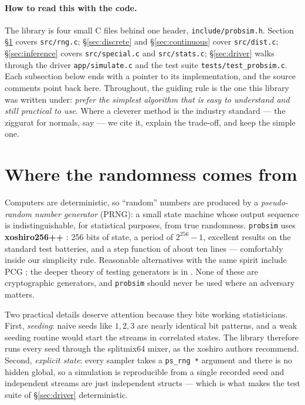 \documentclass[11pt]{article}
\numberwithin{equation}{section}
\begin{document}
\paragraph{How to read this with the code.}
The library is four small C files behind one header,
\texttt{include/probsim.h}.  Section \S\ref{sec:rng} covers
\texttt{src/rng.c}; \S\ref{sec:discrete} and \S\ref{sec:continuous} cover
\texttt{src/dist.c}; \S\ref{sec:inference} covers \texttt{src/special.c}
and \texttt{src/stats.c}; \S\ref{sec:driver} walks through the driver
\texttt{app/simulate.c} and the test suite \texttt{tests/test\_probsim.c}.
Each subsection below ends with a pointer to its implementation, and the
source comments point back here.  Throughout, the guiding rule is the one
this library was written under: \emph{prefer the simplest algorithm that is
easy to understand and still practical to use}.  Where a cleverer method is
the industry standard --- the ziggurat for normals, say
\citep{marsaglia2000ziggurat} --- we cite it, explain the trade-off, and
keep the simple one.

\section{Where the randomness comes from}\label{sec:rng}

Computers are deterministic, so ``random'' numbers are produced by a
\emph{pseudo-random number generator} (PRNG): a small state machine whose
output sequence is indistinguishable, for statistical purposes, from true
randomness.  \texttt{probsim} uses \textbf{xoshiro256++}
\citep{blackman2021xoshiro}: 256 bits of state, a period of $2^{256}-1$,
excellent results on the standard test batteries, and a step function of
about ten lines --- comfortably inside our simplicity rule.  Reasonable
alternatives with the same spirit include PCG \citep{oneill2014pcg}; the
deeper theory of testing generators is in \citet[ch.~3]{knuth1997}.  None
of these are cryptographic generators, and \texttt{probsim} should never be
used where an adversary matters.

Two practical details deserve attention because they bite working
statisticians.  First, \emph{seeding}: naive seeds like $1, 2, 3$ are
nearly identical bit patterns, and a weak seeding routine would start the
streams in correlated states.  The library therefore runs every seed
through the splitmix64 mixer, as the xoshiro authors recommend.  Second,
\emph{explicit state}: every sampler takes a \texttt{ps\_rng~*} argument
and there is no hidden global, so a simulation is reproducible from a
single recorded seed and independent streams are just independent structs
--- which is what makes the test suite of \S\ref{sec:driver} deterministic.
\end{document}
